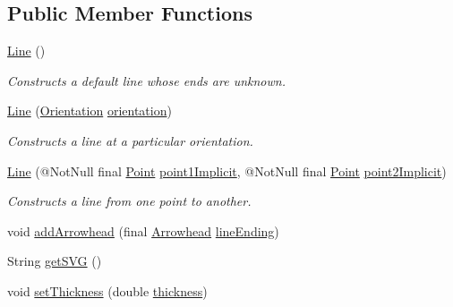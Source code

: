 \subsection*{Public Member Functions}
\begin{DoxyCompactItemize}
\item 
\hyperlink{classcom_1_1aarrelaakso_1_1drawl_1_1_line_af96a733c80d52bf419cab52fb09bc514}{Line} ()
\begin{DoxyCompactList}\small\item\em Constructs a default line whose ends are unknown. \end{DoxyCompactList}\item 
\hyperlink{classcom_1_1aarrelaakso_1_1drawl_1_1_line_aaeb9fdd60eeec26d881cb88a23c116b5}{Line} (\hyperlink{enumcom_1_1aarrelaakso_1_1drawl_1_1_line_1_1_orientation}{Orientation} \hyperlink{classcom_1_1aarrelaakso_1_1drawl_1_1_line_a441ce546831b219e01f5fd0f7e0bb3b1}{orientation})
\begin{DoxyCompactList}\small\item\em Constructs a line at a particular orientation. \end{DoxyCompactList}\item 
\hyperlink{classcom_1_1aarrelaakso_1_1drawl_1_1_line_a9e956655eba16543d82728923c3eb4f6}{Line} (@Not\+Null final \hyperlink{classcom_1_1aarrelaakso_1_1drawl_1_1_point}{Point} \hyperlink{classcom_1_1aarrelaakso_1_1drawl_1_1_line_a48220286707ae05387f9c99d9e08784c}{point1\+Implicit}, @Not\+Null final \hyperlink{classcom_1_1aarrelaakso_1_1drawl_1_1_point}{Point} \hyperlink{classcom_1_1aarrelaakso_1_1drawl_1_1_line_a055d1e743c66cc808f108664b38d7de2}{point2\+Implicit})
\begin{DoxyCompactList}\small\item\em Constructs a line from one point to another. \end{DoxyCompactList}\item 
void \hyperlink{classcom_1_1aarrelaakso_1_1drawl_1_1_line_a7c54922855fda2590c962ac8e03c220c}{add\+Arrowhead} (final \hyperlink{classcom_1_1aarrelaakso_1_1drawl_1_1_arrowhead}{Arrowhead} \hyperlink{classcom_1_1aarrelaakso_1_1drawl_1_1_line_a6a82ee992a758049f71dfbb22c597149}{lineEnding})
\item 
String \hyperlink{classcom_1_1aarrelaakso_1_1drawl_1_1_line_a6a54dd70515b691c8afa88f980e10698}{get\+S\+VG} ()
\item 
void \hyperlink{classcom_1_1aarrelaakso_1_1drawl_1_1_line_af58511076072e05cf42641ee44d0d0d7}{set\+Thickness} (double \hyperlink{classcom_1_1aarrelaakso_1_1drawl_1_1_line_a314ae0371f5665cf70ad99742d44934a}{thickness})

\end{DoxyCompactItemize}
